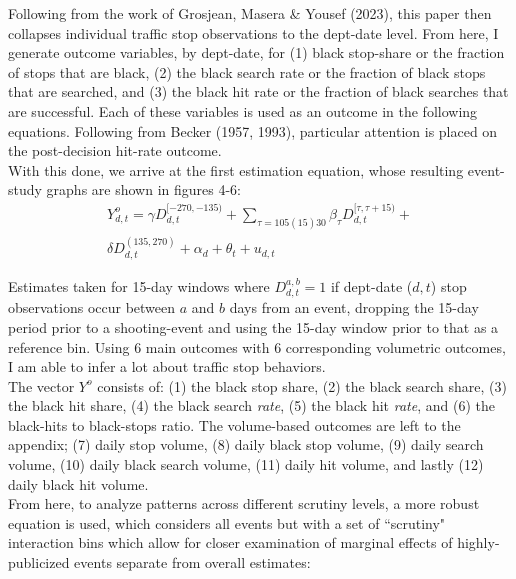 \documentclass[12pt,a4paper]{article}
\begin{document}
Following from the work of Grosjean, Masera \& Yousef (2023), this paper then collapses individual traffic stop observations to the dept-date level. From here, I generate outcome variables, by dept-date, for (1) black stop-share or the fraction of stops that are black, (2) the black search rate or the fraction of black stops that are searched, and (3) the black hit rate or the fraction of black searches that are successful. Each of these variables is used as an outcome in the following equations. Following from Becker (1957, 1993), particular attention is placed on the post-decision hit-rate outcome. \\

With this done, we arrive at the first estimation equation, whose resulting event-study graphs are shown in figures 4-6: \\

\begin{equation}
	\begin{split}
	Y^{o}_{d,t} = \gamma D^{[-270,-135)}_{d,t} + \sum_{\tau=105(15)30} \beta_{\tau}D^{[\tau,\tau+15)}_{d,t} + \\
		\delta D^{(135,270)}_{d,t} + \alpha_{d} + \theta_{t} + u_{d,t} 
	\end{split}
\end{equation}

Estimates taken for 15-day windows where $D^{a,b}_{d,t}=1$ if dept-date ($d,t$) stop observations occur between $a$ and $b$ days from an event, dropping the 15-day period prior to a shooting-event and using the 15-day window prior to that as a reference bin. Using 6 main outcomes with 6 corresponding volumetric outcomes, I am able to infer a lot about traffic stop behaviors. \\

The vector $Y^{o}$ consists of: (1) the black stop share, (2) the black search share, (3) the black hit share, (4) the black search \emph{rate}, (5) the black hit \emph{rate}, and (6) the black-hits to black-stops ratio. The volume-based outcomes are left to the appendix; (7) daily stop volume, (8) daily black stop volume, (9) daily search volume, (10) daily black search volume, (11) daily hit volume, and lastly (12) daily black hit volume. \\

From here, to analyze patterns across different scrutiny levels, a more robust equation is used, which considers all events but with a set of ``scrutiny" interaction bins which allow for closer examination of marginal effects of highly-publicized events separate from overall estimates: \\
\end{document}
